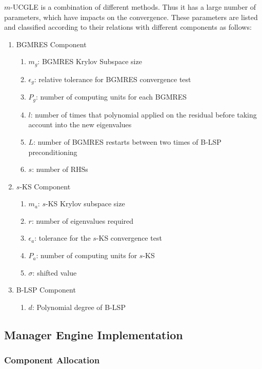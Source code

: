 $m$-UCGLE is a combination of different methods. Thus it has a large number of parameters, which have impacts on the convergence. These parameters are listed and classified according to their relations with different components as follows:

\begin{enumerate}
	\item BGMRES Component
	\begin{enumerate}
		\item $m_g$: BGMRES Krylov Subspace size
		\item $\epsilon_g$: relative tolerance for BGMRES convergence test
		\item $P_g$: number of computing units for each BGMRES
		\item $l$: number of times that polynomial applied on the residual before taking account into the new eigenvalues
		\item $L$: number of BGMRES restarts between two times of B-LSP preconditioning
		\item $s$: number of RHSs
	\end{enumerate}
	\item $s$-KS Component
	\begin{enumerate}
		\item $m_a$: $s$-KS Krylov subspace size
		\item $r$: number of eigenvalues required
		\item $\epsilon_a$: tolerance for the $s$-KS convergence test
		\item $P_a$: number of computing units for $s$-KS
		\item  $\sigma$: shifted value
	\end{enumerate}
	\item B-LSP Component
	\begin{enumerate}
		\item $d$: Polynomial degree of B-LSP
	\end{enumerate}
\end{enumerate}

\subsection{Manager Engine Implementation}\label{engineimpl}

\subsubsection{Component Allocation}

